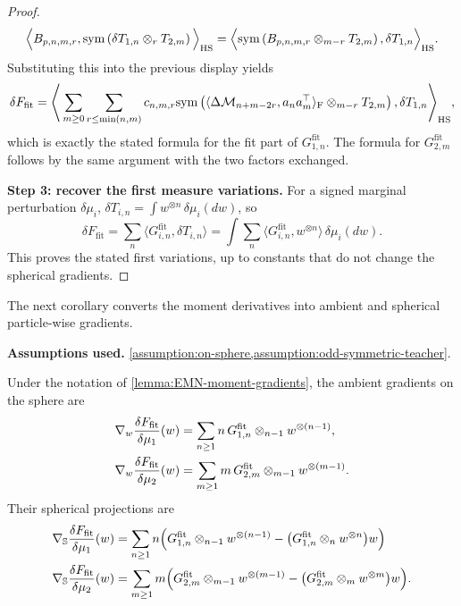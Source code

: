 \begin{proof}
\begin{equation}
    \Big\langle B_{p,n,m,r}, \mathrm{sym}\left({\delta T_{1,n}\otimes_{r} T_{2,m}}\right)\Big\rangle_{\mathrm{HS}}
    =
    \Big\langle \mathrm{sym}\left({B_{p,n,m,r}\otimes_{m-r}T_{2,m}}\right), \delta T_{1,n}\Big\rangle_{\mathrm{HS}}.
\end{equation}
Substituting this into the previous display yields
\begin{equation}
    \delta F_{\mathrm{fit}}
    =
    \Bigg\langle
        \sum_{m\ge 0}\sum_{r\le \min(n,m)}
        c_{n,m,r}
        \mathrm{sym}\left({\langle \Delta\mathcal M_{n+m-2r}, a_n a_m^\top\rangle_{\mathrm F}\otimes_{m-r}T_{2,m}}\right),
        \delta T_{1,n}
    \Bigg\rangle_{\mathrm{HS}},
\end{equation}
which is exactly the stated formula for the fit part of $G_{1,n}^{\mathrm{fit}}$. The formula for \(G_{2,m}^{\mathrm{fit}}\) follows by the same argument with the two factors exchanged.

\par\noindent\textbf{Step 3: recover the first measure variations.}
For a signed marginal perturbation $\delta\mu_i$,
$\delta T_{i,n}=\int w^{\otimes n}\,\delta\mu_i(dw)$, so
\[
 \delta F_{\mathrm{fit}}
 =\sum_n\langle G_{i,n}^{\mathrm{fit}},\delta T_{i,n}\rangle
 =\int\sum_n\langle G_{i,n}^{\mathrm{fit}},w^{\otimes n}\rangle
                    \,\delta\mu_i(dw).
\]
This proves the stated first variations, up to constants that do not
change the spherical gradients.
\end{proof}

The next corollary converts the moment derivatives into ambient and spherical
particle-wise gradients.

\begin{corollary}
\label{corollary:EMN-first-order-gradients}
\textbf{Assumptions used.} \cref{assumption:on-sphere,assumption:odd-symmetric-teacher}.

Under the notation of \cref{lemma:EMN-moment-gradients}, the ambient gradients on the sphere are
\begin{align}
    \nabla_w\frac{\delta F_\mathrm{fit}}{\delta \mu_1}(w)
    &=
    \sum_{n\ge1} n\,G_{1,n}^{\mathrm{fit}}\otimes_{n-1}w^{\otimes(n-1)},
    \\
    \nabla_w\frac{\delta F_\mathrm{fit}}{\delta \mu_2}(w)
    &=
    \sum_{m\ge1} m\,G_{2,m}^{\mathrm{fit}}\otimes_{m-1}w^{\otimes(m-1)}.
\end{align}
Their spherical projections are
\begin{align}
\label{eq:spherical-gradient-factor1-squared-chi2}
    \nabla_{\mathbb{S}}\frac{\delta F_\mathrm{fit}}{\delta \mu_1}(w)
    &=
    \sum_{n\ge1} n\Big(
        G_{1,n}^{\mathrm{fit}}\otimes_{n-1}w^{\otimes(n-1)}
        -\big(G_{1,n}^{\mathrm{fit}}\otimes_{n}w^{\otimes n}\big)w
    \Big)
    \\
\label{eq:spherical-gradient-factor2-squared-chi2}
    \nabla_{\mathbb{S}}\frac{\delta F_\mathrm{fit}}{\delta \mu_2}(w)
    &=
    \sum_{m\ge1} m\Big(
        G_{2,m}^{\mathrm{fit}}\otimes_{m-1}w^{\otimes(m-1)}
        -\big(G_{2,m}^{\mathrm{fit}}\otimes_{m}w^{\otimes m}\big)w
    \Big).
\end{align}
\end{corollary}


